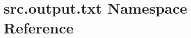 \hypertarget{namespacesrc_1_1output_1_1txt}{\section{src.\+output.\+txt Namespace Reference}
\label{namespacesrc_1_1output_1_1txt}
}
